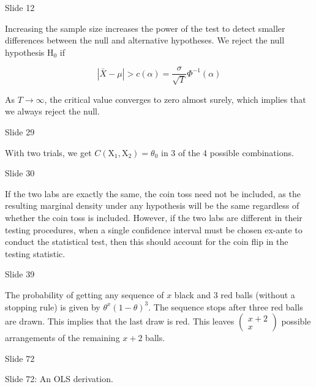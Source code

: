 \documentclass{article}
\begin{document}
\begin{problem}{Slide 12}
\end{problem}

Increasing the sample size increases the power of the test to detect smaller differences between the null and alternative hypotheses. We reject the null hypothesis $\mathrm{H}_{0}$ if

$$
|\bar{X}-\mu|>c(\alpha)=\frac{\sigma}{\sqrt{T}} \Phi^{-1}(\alpha)
$$

As $T \rightarrow \infty$, the critical value converges to zero almost surely, which implies that we always reject the null.
\begin{problem}{Slide 29}
\end{problem}

With two trials, we get $C\left(\mathrm{X}_{1}, \mathrm{X}_{2}\right)=\theta_{0}$ in 3 of the 4 possible combinations.



\begin{problem}{Slide 30}
\end{problem}
If the two labs are exactly the same, the coin toss need not be included, as the resulting marginal density under any hypothesis will be the same regardless of whether the coin toss is included. However, if the two labs are different in their testing procedures, when a single confidence interval must be chosen ex-ante to conduct the statistical test, then this should account for the coin flip in the testing statistic.


\begin{problem}{Slide 39}
\end{problem}
The probability of getting any sequence of $x$ black and 3 red balls (without a stopping rule) is given by $\theta^{x}(1-\theta)^{3}$. The sequence stops after three red balls are drawn. This implies that the last draw is red. This leaves $\left(\begin{array}{c}x+2 \\ x\end{array}\right)$ possible arrangements of the remaining $x+2$ balls.

\begin{problem}{Slide 72}
\end{problem}

Slide 72: An OLS derivation.

\newpage

\end{document}

